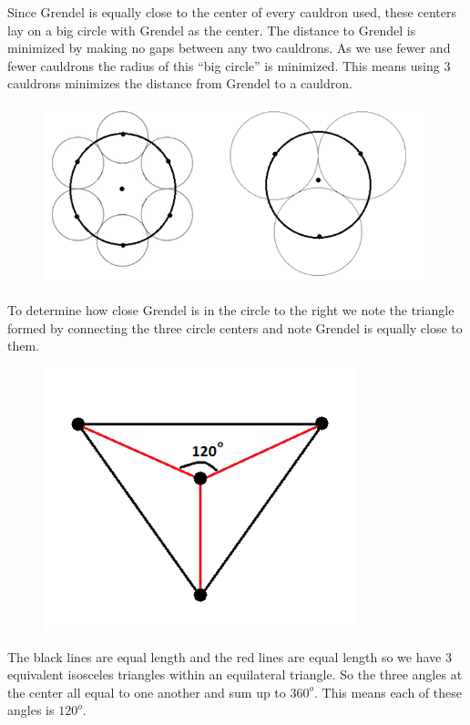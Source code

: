 


Since Grendel is equally close to the center of every cauldron used, these centers lay on a big circle with Grendel as the center. The distance to Grendel is minimized by making no gaps between any two cauldrons. As we use fewer and fewer cauldrons the radius of this ``big circle'' is minimized. This means using 3 cauldrons minimizes the distance from Grendel to a cauldron.


\begin{figure}[h!]
\centering
\includegraphics[scale=.5]{assets/josh/circles}
\end{figure}

To determine how close Grendel is in the circle to the right we note the triangle formed by connecting the three circle centers and note Grendel is equally close to them.

\begin{figure}[h!]
\centering
\includegraphics[scale=.5]{assets/josh/bigtri}
\end{figure}

The black lines are equal length and the red lines are equal length so we have 3 equivalent isosceles triangles within an equilateral triangle. So the three angles at the center all equal to one another and sum up to $360^o$. This means each of these angles is $120^o$.

